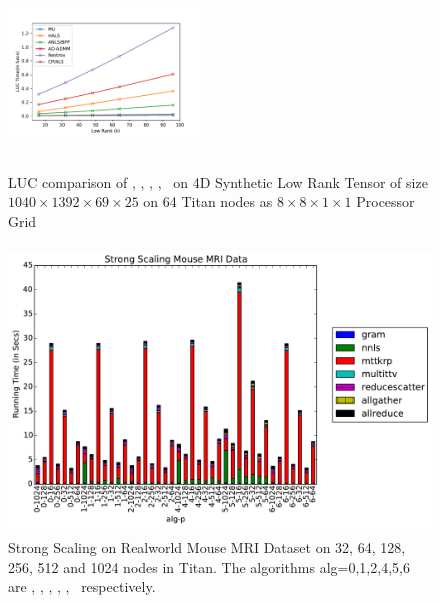 \begin{figure}
   \includegraphics[width=0.45\textwidth, height=2in]{data/plots/lucmouse64.pdf}
	\caption{LUC comparison of \MU, \HALS, \BPP, \ADMM, \Nestrov\ on 4D Synthetic Low Rank Tensor of size $1040\times1392\times69\times25$ on 64 Titan nodes as $8\times8\times1\times1$ Processor Grid}
	\label{fig:luccompmouse}
\end{figure}

\begin{figure}
	\includegraphics[width=\textwidth, height=3in]{data/plots/ssrw_mouse.pdf}
	\caption {Strong Scaling on Realworld Mouse MRI Dataset on 32, 64, 128, 256, 512 and 1024 nodes in Titan. The algorithms alg=0,1,2,4,5,6 are \MU, \HALS, \BPP, \ADMM, \Nestrov, \CPALS\ respectively.}
	\label{fig:synstrongscaling}
\end{figure}

